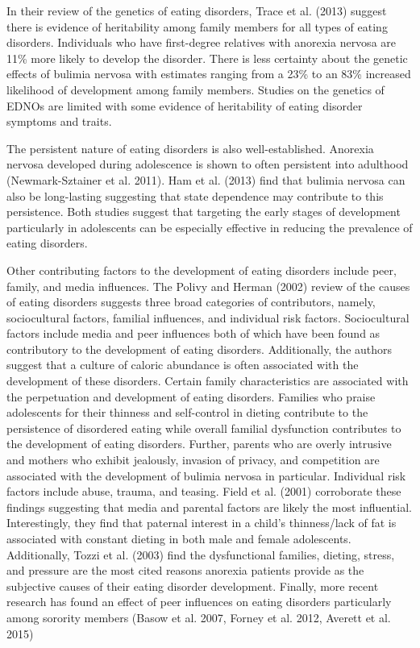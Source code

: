 \documentclass[12pt]{article}
\begin{document}
In their review of the genetics of eating disorders, Trace et al. (2013) suggest there is evidence of heritability among family members for all types of eating disorders. Individuals who have first-degree relatives with anorexia nervosa are 11\% more likely to develop the disorder. There is less certainty about the genetic effects of bulimia nervosa with estimates ranging from a 23\% to an 83\% increased likelihood of development among family members. Studies on the genetics of EDNOs are limited with some evidence of heritability of eating disorder symptoms and traits.

The persistent nature of eating disorders is also well-established. Anorexia nervosa developed during adolescence is shown to often persistent into adulthood (Newmark-Sztainer et al. 2011). Ham et al. (2013) find that bulimia nervosa can also be long-lasting suggesting that state dependence may contribute to this persistence. Both studies suggest that targeting the early stages of development particularly in adolescents can be especially effective in reducing the prevalence of eating disorders.

Other contributing factors to the development of eating disorders include peer, family, and media influences. The Polivy and Herman (2002) review of the causes of eating disorders suggests three broad categories of contributors, namely, sociocultural factors, familial influences, and individual risk factors. Sociocultural factors include media and peer influences both of which have been found as contributory to the development of eating disorders. Additionally, the authors suggest that a culture of caloric abundance is often associated with the development of these disorders. Certain family characteristics are associated with the perpetuation and development of eating disorders. Families who praise adolescents for their thinness and self-control in dieting contribute to the persistence of disordered eating while overall familial dysfunction contributes to the development of eating disorders. Further, parents who are overly intrusive and mothers who exhibit jealously, invasion of privacy, and competition are associated with the development of bulimia nervosa in particular. Individual risk factors include abuse, trauma, and teasing. Field et al. (2001) corroborate these findings suggesting that media and parental factors are likely the most influential. Interestingly, they find that paternal interest in a child's thinness/lack of fat is associated with constant dieting in both male and female adolescents. Additionally, Tozzi et al. (2003) find the dysfunctional families, dieting, stress, and pressure are the most cited reasons anorexia patients provide as the subjective causes of their eating disorder development. Finally, more recent research has found an effect of peer influences on eating disorders particularly among sorority members (Basow et al. 2007, Forney et al. 2012, Averett et al. 2015)
\end{document}
